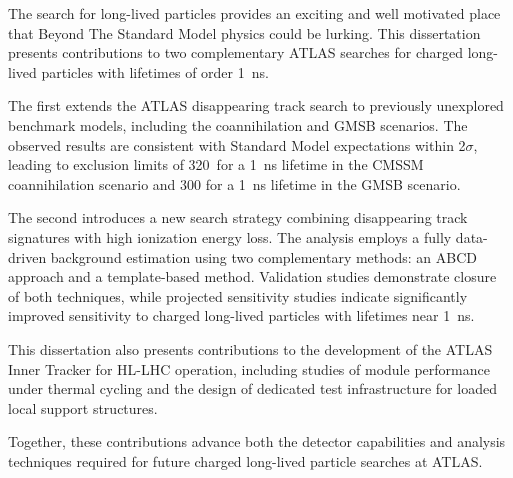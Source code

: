 \small The search for long-lived particles provides an exciting and well motivated place that Beyond The Standard Model physics could be lurking. This dissertation presents contributions to two complementary ATLAS searches for charged long-lived particles with lifetimes of order 1~ns.

The first extends the ATLAS disappearing track search to previously unexplored \stau benchmark models, including the \stau coannihilation and GMSB scenarios. The observed results are consistent with Standard Model expectations within 2$\sigma$, leading to exclusion limits of 320~\GeV for a 1~ns lifetime in the CMSSM \stau coannihilation scenario and 300 \GeV for a 1~ns lifetime in the GMSB \stau scenario.

The second introduces a new search strategy combining disappearing track signatures with high ionization energy loss. The analysis employs a fully data-driven background estimation using two complementary methods: an ABCD approach and a template-based method. Validation studies demonstrate closure of both techniques, while projected sensitivity studies indicate significantly improved sensitivity to charged long-lived particles with lifetimes near 1~ns.

This dissertation also presents contributions to the development of the ATLAS Inner Tracker for HL-LHC operation, including studies of module performance under thermal cycling and the design of dedicated test infrastructure for loaded local support structures.

Together, these contributions advance both the detector capabilities and analysis techniques required for future charged long-lived particle searches at ATLAS.